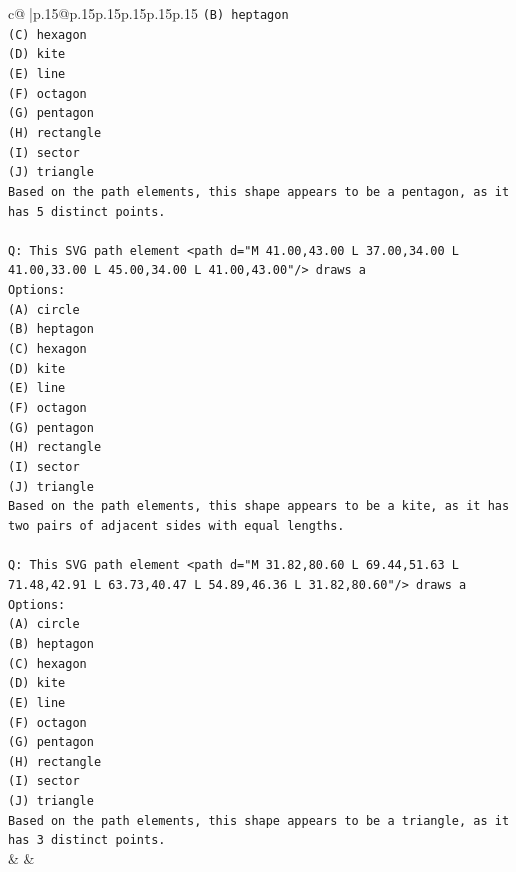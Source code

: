 \documentclass{article}
\begin{document}
{\begin{supertabular}{c@{$\;$}|p{.15\linewidth}@{}p{.15\linewidth}p{.15\linewidth}p{.15\linewidth}p{.15\linewidth}p{.15\linewidth}}
{{{\texttt{(B) heptagon} \\
\texttt{(C) hexagon} \\
\texttt{(D) kite} \\
\texttt{(E) line} \\
\texttt{(F) octagon} \\
\texttt{(G) pentagon} \\
\texttt{(H) rectangle} \\
\texttt{(I) sector} \\
\texttt{(J) triangle} \\
\texttt{Based on the path elements, this shape appears to be a pentagon, as it has 5 distinct points.} \\
\\ 
\texttt{Q: This SVG path element <path d="M 41.00,43.00 L 37.00,34.00 L 41.00,33.00 L 45.00,34.00 L 41.00,43.00"/> draws a} \\
\texttt{Options:} \\
\texttt{(A) circle} \\
\texttt{(B) heptagon} \\
\texttt{(C) hexagon} \\
\texttt{(D) kite} \\
\texttt{(E) line} \\
\texttt{(F) octagon} \\
\texttt{(G) pentagon} \\
\texttt{(H) rectangle} \\
\texttt{(I) sector} \\
\texttt{(J) triangle} \\
\texttt{Based on the path elements, this shape appears to be a kite, as it has two pairs of adjacent sides with equal lengths.} \\
\\ 
\texttt{Q: This SVG path element <path d="M 31.82,80.60 L 69.44,51.63 L 71.48,42.91 L 63.73,40.47 L 54.89,46.36 L 31.82,80.60"/> draws a} \\
\texttt{Options:} \\
\texttt{(A) circle} \\
\texttt{(B) heptagon} \\
\texttt{(C) hexagon} \\
\texttt{(D) kite} \\
\texttt{(E) line} \\
\texttt{(F) octagon} \\
\texttt{(G) pentagon} \\
\texttt{(H) rectangle} \\
\texttt{(I) sector} \\
\texttt{(J) triangle} \\
\texttt{Based on the path elements, this shape appears to be a triangle, as it has 3 distinct points.} \\
            }
        }
    }
    & & \\ \\


\end{supertabular}}
\end{document}
